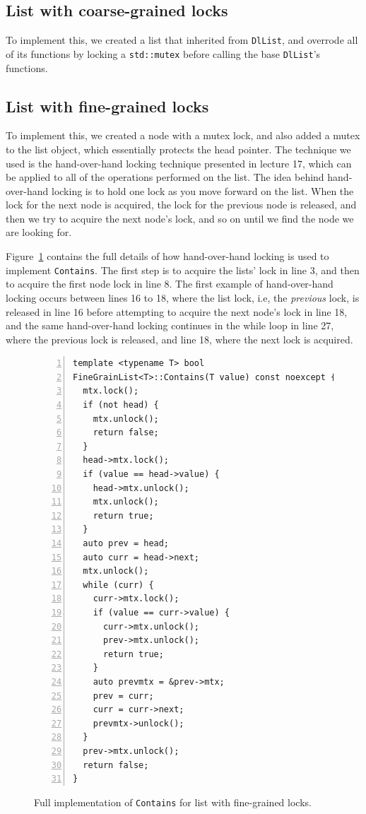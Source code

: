 \documentclass[11pt]{article}
\begin{document}
\subsection{List with coarse-grained locks}
To implement this, we created a list that inherited from {\tt DlList}, and
overrode all of its functions by locking a {\tt std::mutex} before calling the
base {\tt DlList}'s functions.

\subsection{List with fine-grained locks}
To implement this, we created a node with a mutex lock, and also added a mutex
to the list object, which essentially protects the head pointer. The technique
we used is the hand-over-hand locking technique presented in lecture 17, which
can be applied to all of the operations performed on the list. The idea behind
hand-over-hand locking is to hold one lock as you move forward on the list. When
the lock for the next node is acquired, the lock for the previous node is
released, and then we try to acquire the next node's lock, and so on until we
find the node we are looking for.

Figure~\ref{fig:finegrain} contains the full details of how hand-over-hand
locking is used to implement {\tt Contains}. The first step is to acquire the
lists' lock in line 3, and then to acquire the first node lock in line 8. The
first example of hand-over-hand locking occurs between lines 16 to 18, where the
list lock, i.e, the {\it previous} lock, is released in line 16 before
attempting to acquire the next node's lock in line 18, and the same
hand-over-hand locking continues in the while loop in line 27, where the
previous lock is released, and line 18, where the next lock is acquired.

\begin{figure}[h]
\begin{center}
\begin{lstlisting}[numbers=left]
template <typename T> bool
FineGrainList<T>::Contains(T value) const noexcept {
  mtx.lock();
  if (not head) {
    mtx.unlock();
    return false;
  }
  head->mtx.lock();
  if (value == head->value) {
    head->mtx.unlock();
    mtx.unlock();
    return true;
  }
  auto prev = head;
  auto curr = head->next;
  mtx.unlock();
  while (curr) {
    curr->mtx.lock();
    if (value == curr->value) {
      curr->mtx.unlock();
      prev->mtx.unlock();
      return true;
    }
    auto prevmtx = &prev->mtx;
    prev = curr;
    curr = curr->next;
    prevmtx->unlock();
  }
  prev->mtx.unlock();
  return false;
}
\end{lstlisting}
\caption{
Full implementation of {\tt Contains} for list with fine-grained locks.}
\label{fig:finegrain}
\end{center}
\end{figure}
\end{document}
